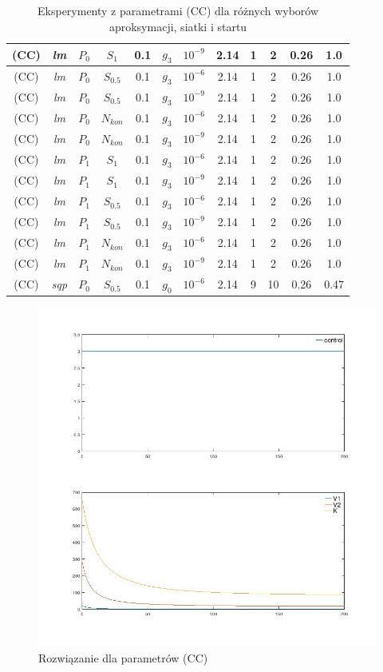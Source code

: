 \documentclass[11pt]{article}
\begin{document}
\begin{table}[h]
\begin{center}
\begin{tabular}{|c|c|c|c|c|c|c||c|c|c|c|c|}
      \hline
      (CC) & {\it lm\/} & $P_0$ & $S_1$ & 0.1 & $g_3$ & $10^{-9}$ & 2.14 & 1 & 2 & 0.26 & 1.0 \\
      \hline
      (CC) & {\it lm\/} & $P_0$ & $S_{0.5}$ & 0.1 & $g_3$ & $10^{-6}$ & 2.14 & 1 & 2 & 0.26 & 1.0 \\
      \hline
      (CC) & {\it lm\/} & $P_0$ & $S_{0.5}$ & 0.1 & $g_3$ & $10^{-9}$ & 2.14 & 1 & 2 & 0.26 & 1.0 \\
      \hline
      (CC) & {\it lm\/} & $P_0$ & $N_{kon}$ & 0.1 & $g_3$ & $10^{-6}$ & 2.14 & 1 & 2 & 0.26 & 1.0 \\
      \hline
      (CC) & {\it lm\/} & $P_0$ & $N_{kon}$ & 0.1 & $g_3$ & $10^{-9}$ & 2.14 & 1 & 2 & 0.26 & 1.0 \\
      \hline
      (CC) & {\it lm\/} & $P_1$ & $S_1$ & 0.1 & $g_3$ & $10^{-6}$ & 2.14 & 1 & 2 & 0.26 & 1.0 \\
      \hline
      (CC) & {\it lm\/} & $P_1$ & $S_1$ & 0.1 & $g_3$ & $10^{-9}$ & 2.14 & 1 & 2 & 0.26 & 1.0 \\
      \hline
      (CC) & {\it lm\/} & $P_1$ & $S_{0.5}$ & 0.1 & $g_3$ & $10^{-6}$ & 2.14 & 1 & 2 & 0.26 & 1.0 \\
      \hline
      (CC) & {\it lm\/} & $P_1$ & $S_{0.5}$ & 0.1 & $g_3$ & $10^{-9}$ & 2.14 & 1 & 2 & 0.26 & 1.0 \\
      \hline
      (CC) & {\it lm\/} & $P_1$ & $N_{kon}$ & 0.1 & $g_3$ & $10^{-6}$ & 2.14 & 1 & 2 & 0.26 & 1.0 \\
      \hline
      (CC) & {\it lm\/} & $P_1$ & $N_{kon}$ & 0.1 & $g_3$ & $10^{-9}$ & 2.14 & 1 & 2 & 0.26 & 1.0 \\
      \hline
      (CC) & {\it sqp\/} & $P_0$ & $S_{0.5}$ & 0.1 & $g_0$ & $10^{-6}$ & 2.14 & 9 & 10 & 0.26 & 0.47 \\
      \hline
    \end{tabular}
    \caption{Eksperymenty z parametrami (CC) dla różnych wyborów aproksymacji, siatki i startu}\label{param1_tbl}
  \end{center}
\end{table}

\begin{figure}[h]
  \centering
  \includegraphics[width=.5\textwidth]{../plots/plot_max}
  \caption{Rozwiązanie dla parametrów (CC)}\label{max_plot}
\end{figure}
\end{document}
